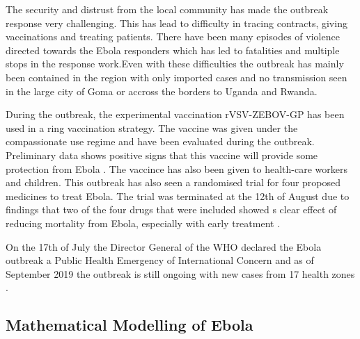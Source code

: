 \documentclass[12pt]{article}
\begin{document}
The security and distrust from the local community has made the outbreak response very challenging. This has lead to difficulty in tracing contracts, giving vaccinations and treating patients. There have been many episodes of violence directed towards the Ebola responders which has led to fatalities and multiple stops in the response work\cite{worldhealthorganizationEbolaOutbreakDRC2018c,worldhealthorganizationEbolaOutbreakDRC2019a}.Even with these difficulties the outbreak has mainly been contained in the region with only imported cases and no transmission seen in the large city of Goma or accross the borders to Uganda and Rwanda. 

During the outbreak, the experimental vaccination rVSV-ZEBOV-GP has been used in a ring vaccination strategy. The vaccine was given under the compassionate use regime and have been evaluated during the outbreak. Preliminary data shows positive signs that this vaccine will provide some protection from Ebola \cite{organizationPreliminaryResultsEfficacy2019}. The vaccince has also been given to health-care workers and children. This outbreak has also seen a randomised trial for four proposed medicines to treat Ebola. The trial was terminated at the 12th of August due to findings that two of the four drugs that were included showed s clear effect of reducing mortality from Ebola, especially with early treatment \cite{nationalinstituteofallergyandinfectiousdiseasesIndependentMonitoringBoard2019}.

On the 17th of July the Director General of the WHO declared the Ebola outbreak a Public Health Emergency of International Concern \cite{worldhealthorganizationEbolaOutbreakDRC2019} and as of September 2019 the outbreak is still ongoing with new cases from 17 health zones \cite{worldhealthorganizationEbolaOutbreakDRC2019b}. 

\subsection{Mathematical Modelling of Ebola}
\end{document}
